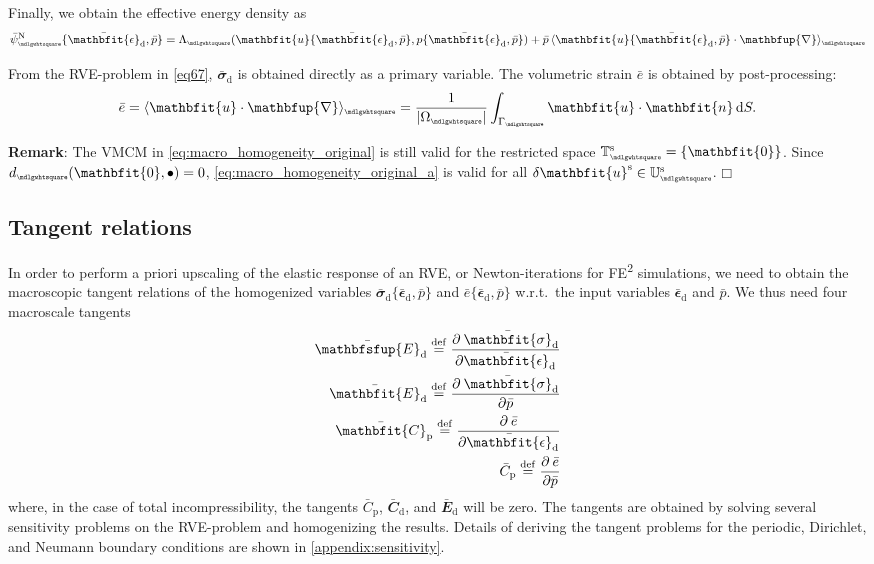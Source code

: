 \documentclass[12pt,a4paper]{article}
\renewcommand{\ta}[1]{\mathbfit{#1}}
\renewcommand{\ts}[1]{\mathbfit{#1}}
\renewcommand{\tf}[1]{\mathbfsfup{#1}}
\renewcommand{\diff}{\mathbfup{\nabla}}
\renewcommand{\Box}{\mdlgwhtsquare}
\DeclarePairedDelimiter{\homgen}{\langle}{\rangle_\rve}
\renewcommand{\dev}{\mathrm{d}}
\newcommand{\volume}{|\Omega_\rve|}
\newcommand{\ded}{\mathrm{d}}
\newcommand{\dep}{\mathrm{p}}
\newcommand{\rve}{
  {\mathchoice
   {\mbox{\scalebox{0.67}{$\Box$}}}
   {\mbox{\scalebox{0.67}{$\Box$}}}
   {\mbox{\scalebox{0.5}{$\Box$}}}
   {\mbox{\scalebox{0.375}{$\Box$}}}
  }
}
\begin{document}
Finally, we obtain the effective energy density as
\begin{equation}
    \bar{\psi}_\rve^\Neumann\{\bar{\ts\epsilon}_\dev,\bar{p}\} =
    \Lambda_\rve(\ta{u}\{\bar{\ts\epsilon}_\dev,\bar{p}\},p\{\bar{\ts\epsilon}_\dev,\bar{p}\}) + \bar{p}\,\homgen{ \ta{u}\{\bar{\ts\epsilon}_\dev,\bar{p}\}\cdot\diff }
\label{eq105}
\end{equation}

From the RVE-problem in \cref{eq67}, $\bar{\ts\sigma}_\dev$ is obtained directly as a primary variable.
The volumetric strain $\bar{e}$ is obtained by post-processing:
\begin{align}
 \bar{e} = \homgen{\ta u\cdot\diff} = \frac{1}{\volume} \int_{\Gamma_\rve} \ta u \cdot \ta n\dif S.
\end{align}

\textbf{Remark}:
The VMCM in \cref{eq:macro_homogeneity_original} is still valid for the restricted space $\set{T}_\rve^\fluct = \{\ta 0\}$.
Since $d_\rve(\ta 0, \bullet) = 0$, \cref{eq:macro_homogeneity_original_a} is valid for all $\delta\ta u^\fluct \in \set U_\rve^\fluct$. $\Box$


\subsection{Tangent relations}
In order to perform a priori upscaling of the elastic response of an RVE, or Newton-iterations for FE\textsuperscript{2} simulations, we need to obtain the macroscopic tangent relations of the homogenized variables $\bar{\ts\sigma}_\dev\{\bar{\ts\epsilon}_\dev,\bar{p}\}$ and $\bar{e}\{\bar{\ts\epsilon}_\dev,\bar{p}\}$ w.r.t.\ the input variables $\bar{\ts\epsilon}_\dev$ and $\bar{p}$.
We thus need four macroscale tangents
\begin{subequations}
\label{eq:macro_tangents}
\begin{align}
 \bar{\tf E}_\ded \defeq \pd{\bar{\ts\sigma}_\dev}{\bar{\ts\epsilon}_\dev}\\
 \bar{\ts E}_\ded \defeq \pd{\bar{\ts\sigma}_\dev}{\bar{p}}\\
 \bar{\ts C}_\dep \defeq \pd{\bar{e}}{\bar{\ts\epsilon}_\dev}\\
 \bar{C}_\dep \defeq \pd{\bar{e}}{\bar{p}}
\end{align}
\end{subequations}
where, in the case of total incompressibility, the tangents $\bar{C}_\dep$, $\bar{\ta C}_\ded$, and $\bar{\ta E}_\ded$ will be zero.
The tangents are obtained by solving several sensitivity problems on the RVE-problem and homogenizing the results.
Details of deriving the tangent problems for the periodic, Dirichlet, and Neumann boundary conditions are shown in \cref{appendix:sensitivity}.
\end{document}
